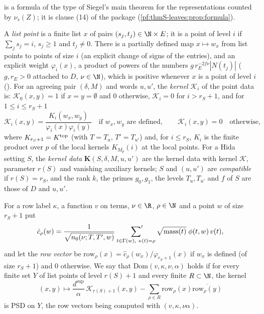  is a formula of the type of Siegel's main theorem \cite{Siegel1935} for the
representations counted by $\nu_s(Z)$; it is clause (14) of the package (\cref{pf:thmS-leaves:prop:formula}).

\begin{definition}\label{pf:thmS-leaves:def:rows}
A \emph{list point} is a finite list $x$ of pairs $(s_j,t_j)\in\N\times E$; it is a point of level $i$ if
$\sum_js_j=i$, $s_j\ge1$ and $t_j\ne0$. There is a partially defined map $x\mapsto w_x$ from list points to points of
size $i$ (an explicit change of signs of the entries), and an explicit weight $\varphi_i(x)$, a product of powers of
the numbers $g\,r_E^{-2f\nu}|N(t_j)|$ ($g,r_E>0$ attached to $D$, $\nu\in\N$), which is positive whenever $x$ is a point of
level $i$ (). For an agreeing pair $(\delta,M)$ and words $u,u'$, the
\emph{kernel} $\mathcal K_i$ of the point data is: $\mathcal K_0(x,y)=1$ if $x=y=\emptyset$ and $0$ otherwise,
$\mathcal K_i=0$ for $i>r_S+1$, and for $1\le i\le r_S+1$
\[
\mathcal K_i(x,y)=\frac{K_i(w_x,w_y)}{\varphi_i(x)\varphi_i(y)}\quad\text{if $w_x,w_y$ are defined},\qquad
\mathcal K_i(x,y)=0\quad\text{otherwise},
\]
where $K_{r_S+1}=K^{\mathrm{top}}$ (with $T=T_u$, $T'=T_{u'}$) and, for $i\le r_S$, $K_i$ is the finite product over $p$ of the
local kernels $K_{M_p}(i)$ at the local points. For a Hida setting $S$, the \emph{kernel data}
$\mathbf K(S,\delta,M,u,u')$ are the kernel data with kernel $\mathcal K$, parameter $r(S)$ and vanishing auxiliary
kernels; $S$ and $(u,u')$ are \emph{compatible} if $r(S)=r_S$, and the rank $k$, the primes $g_0,g_1$, the levels
$T_u,T_{u'}$ and $f$ of $S$ are those of $D$ and $u,u'$.

For a row label $\kappa$, a function $v$ on terms, $\nu\in\R$, $\rho\in\N$ and a point $w$ of size $r_S+1$ put
\begin{equation}\label{pf:thmS-leaves:eq:chat}
\hat c_\rho(w)=\frac{1}{\sqrt{n_0(\nu;T,T',w)}}\ \sideset{}{'}\sum_{t\in\Gamma(w),\ \kappa(t)=\rho}\sqrt{\mathrm{mass}(t)}\;
\phi(t,w)\,v(t),
\end{equation}
and let the \emph{row vector} be $\mathrm{row}_\rho(x)=\hat c_\rho(w_x)/\varphi_{r_S+1}(x)$ if $w_x$ is defined (of size
$r_S+1$) and $0$ otherwise. We say that $\mathrm{Dom}(v,\kappa,\nu,\alpha)$ holds if for every finite set $Y$ of list
points of level $r(S)+1$ and every finite $R\subset\N$, the kernel
\[
(x,y)\longmapsto\frac{d^{\sup}}{\alpha}\,\mathcal K_{r(S)+1}(x,y)-\sum_{\rho\in R}\mathrm{row}_\rho(x)\overline{\mathrm{row}_\rho(y)}
\]
is PSD on $Y$, the row vectors being computed with $(v,\kappa,\nu\alpha)$.
\end{definition}

